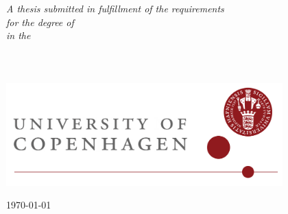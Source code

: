 \documentclass[
11pt, %
english, %
singlespacing, %
headsepline, %
]{MastersDoctoralThesis} %
\begin{document}
\begin{titlepage}
\begin{center}
\vfill

\large \textit{A thesis submitted in fulfillment of the requirements\\ for the degree of \degreename}\\[0.3cm] %
\textit{in the}\\[0.4cm]
\groupname\\\deptname\\\facname\\[1cm] %
\includegraphics[width=0.8\textwidth, height=5\baselineskip, keepaspectratio=true]{university-of-copenhagen.png}

\vfill

{\large \today}\\[1cm] %
 
\vfill
\end{center}
\end{titlepage}



 
\end{document}

